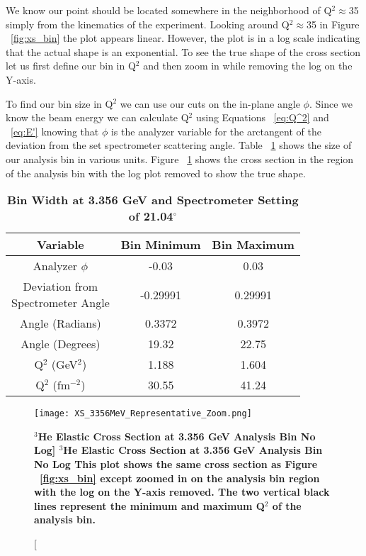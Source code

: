 We know our point should be located somewhere in the neighborhood of Q$^2 \approx$35 simply from the kinematics of the experiment. Looking around Q$^2 \approx$35 in Figure ~\ref{fig:xs_bin} the plot appears linear. However, the plot is in a log scale indicating that the actual shape is an exponential. To see the true shape of the cross section let us first define our bin in Q$^2$ and then zoom in while removing the log on the Y-axis. 

To find our bin size in Q$^2$ we can use our cuts on the in-plane angle $\phi$. Since we know the beam energy we can calculate Q$^2$ using Equations ~\ref{eq:Q^2} and ~\ref{eq:E'} knowing that $\phi$ is the analyzer variable for the arctangent of the deviation from the set spectrometer scattering angle. Table ~\ref{tab:bin} shows the size of our analysis bin in various units. Figure ~\ref{fig:xs_bin_zoom} shows the cross section in the region of the analysis bin with the log plot removed to show the true shape.

\begin{table}[!h]
\centering
\begin{tabular}{|c | c c |}
\hline
\textbf{Variable} & \textbf{Bin Minimum} & \textbf{Bin Maximum}\\
\hline
Analyzer $\phi$ & -0.03 & 0.03\\ 
\makecell{Deviation from \\ Spectrometer Angle} & -0.29991 & 0.29991\\
Angle (Radians) & 0.3372 &  0.3972\\
Angle (Degrees) & 19.32 & 22.75\\
Q$^2$ (GeV$^2$) & 1.188 & 1.604\\
Q$^2$ (fm$^{-2}$) & 30.55 & 41.24\\
\hline
\end{tabular}
\caption{{\bf{Bin Width at 3.356 GeV and Spectrometer Setting of 21.04$^\circ$}} }
\label{tab:bin}
\end{table}

\begin{figure}[!ht]
\begin{center}
\texttt{[image: XS\_3356MeV\_Representative\_Zoom.png]}
\end{center}
\caption[\bf{$^3$He Elastic Cross Section at 3.356 GeV Analysis Bin No Log}]{
{\bf{$^3$He Elastic Cross Section at 3.356 GeV Analysis Bin No Log}} This plot shows the same cross section as Figure ~\ref{fig:xs_bin} except zoomed in on the analysis bin region with the log on the Y-axis removed. The two vertical black lines represent the minimum and maximum Q$^2$ of the analysis bin.}
\label{fig:xs_bin_zoom}
\end{figure}

